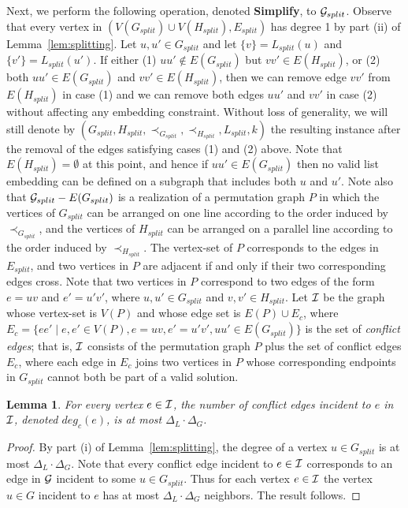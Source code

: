 \documentclass[11pt]{article}
\newtheorem{lemma}[theorem]{Lemma}
\begin{document}
Next, we perform the following operation, denoted {\bf Simplify}, to ${\cal G}_{split}$. Observe that every vertex in $(V(G_{split}) \cup V(H_{split}), E_{split})$ has degree 1 by part (ii) of Lemma~\ref{lem:splitting}. Let $u, u' \in G_{split}$ and let $\{v\}=L_{split}(u)$ and $\{v'\}=L_{split}(u')$. If either (1) $uu' \notin E(G_{split})$ but $vv' \in E(H_{split})$, or (2) both $uu' \in E(G_{split})$ and $vv' \in E(H_{split})$, then we can remove edge $vv'$ from $E(H_{split})$ in case (1) and we can remove both edges $uu'$ and $vv'$ in case (2) without affecting any embedding constraint. Without loss of generality, we will still denote by $(G_{split}, H_{split}, \prec_{G_{split}}, \prec_{H_{split}}, L_{split}, k)$ the resulting instance after the removal of the edges satisfying cases (1) and (2) above. Note that $E(H_{split})= \emptyset$ at this point, and hence if $uu' \in E(G_{split})$ then no valid list embedding can be defined on a subgraph that includes both $u$ and $u'$. Note also that ${\cal G}_{split} - E(G_{split})$ is a realization of a permutation graph $P$ in which the vertices of $G_{split}$ can be arranged on one line according to the order induced by $\prec_{G_{split}}$, and the vertices of $H_{split}$ can be arranged on a parallel line according to the order induced by $\prec_{H_{split}}$. The vertex-set of $P$ corresponds to the edges in $E_{split}$, and two vertices in $P$ are adjacent if and only if their two corresponding edges cross. Note that two vertices in $P$ correspond to two edges of the form $e=uv$ and $e'=u'v'$, where $u, u' \in G_{split}$ and $v, v' \in H_{split}$.
Let ${\cal I}$ be the graph whose vertex-set is $V(P)$ and whose edge set is $E(P) \cup E_c$, where $E_c= \{ee' \mid e, e' \in V(P), e=uv, e'=u'v', uu' \in E(G_{split})\}$ is the set of {\em conflict edges}; that is, ${\cal I}$ consists of the permutation graph $P$ plus the set of conflict edges $E_c$, where each edge in $E_c$ joins two vertices in $P$ whose corresponding endpoints in $G_{split}$ cannot both be part of a valid solution.

\begin{lemma}
\label{lem:boundedconflictdegree}
For every vertex $e \in {\cal I}$, the number of conflict edges incident to $e$ in ${\cal I}$, denoted $deg_c(e)$, is at most $\Delta_L \cdot \Delta_G$.
\end{lemma}

\begin{proof}
By part (i) of Lemma~\ref{lem:splitting}, the degree of a vertex $u \in G_{split}$ is at most $\Delta_L \cdot \Delta_G$.  Note that every conflict edge incident to $e \in {\cal I}$ corresponds to an edge in ${\cal G}$ incident to some $u \in G_{split}$.  Thus for each vertex $e \in {\cal I}$ the vertex $u \in G$ incident to $e$ has at most $\Delta_L \cdot \Delta_G$ neighbors.  The result follows.
\end{proof}
\end{document}
